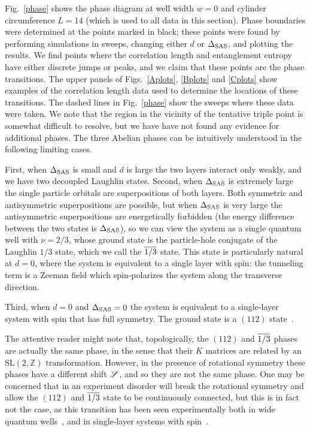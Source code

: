 Fig.~\ref{phase} shows the phase diagram at well width $w=0$ and cylinder circumference $L = 14$ (which is used to all data in this section). 
Phase boundaries were determined at the points marked in black; these points were found by performing simulations in sweeps, changing either $d$ or $\Delta_\textrm{SAS}$, and plotting the results. 
We find points where the correlation length and entanglement entropy have either discrete jumps or peaks, and we claim that these points are the phase transitions.
The upper panels of Figs.~\ref{Aplots}, \ref{Bplots} and \ref{Cplots} show examples of the correlation length data used to determine the locations of these transitions. The dashed lines in Fig.~\ref{phase} show the sweeps where these data were taken. 
We note that the region in the vicinity of the tentative triple point is somewhat difficult to resolve, but we have have not found any evidence for additional phases.
The three Abelian phases can be intuitively understood in the following limiting cases.

First, when $\Delta_\textrm{SAS}$ is small and $d$ is large the two layers interact only weakly, and we have two decoupled Laughlin states.
Second, when $\Delta_\textrm{SAS}$ is extremely large the single particle orbitals are superpositions of both layers. 
Both symmetric and antisymmetric superpositions are possible, but when $\Delta_\textrm{SAS}$ is very large the antisymmetric superpositions are energetically forbidden (the energy difference between the two states is $\Delta_\textrm{SAS}$), so we can view the system as a single quantum well with $\nu=2/3$,  whose ground state is the particle-hole conjugate of the Laughlin $1/3$ state, which we call the $\overline{1/3}$ state. 
This state is particularly natural at $d=0$, where the system is equivalent to a single layer with spin: the tunneling term is a Zeeman field which spin-polarizes the system along the transverse direction.

Third, when $d=0$ and $\Delta_\textrm{SAS}=0$ the system is equivalent to a single-layer system with spin that has full  symmetry.
The ground state is a $(112)$ state~\cite{Wu93, HaldaneDiagram, Moore97}. 

The attentive reader might note that, topologically, the $(112)$ and $\overline{1/3}$ phases are actually the same phase, in the sense that their $K$ matrices are related by an $\mathrm{SL}(2,\mathbb{Z})$ transformation. 
However, in the presence of rotational symmetry  these phases have a different shift $\mathscr{S}$, and so they are not the same phase.
One may be concerned that in an experiment disorder will break the rotational symmetry and allow the $(112)$ and $\overline{1/3}$ state to be continuously connected, but this is in fact not the case, as this transition has been seen experimentally both in wide quantum wells~\cite{Suen94}, and in single-layer systems with spin~\cite{Eisenstein90}.

